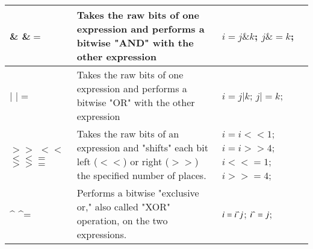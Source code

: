 \documentclass{article}
\begin{document}
\begin{center}
\begin{tabularx}{\textwidth}{
			| >{\raggedright\arraybackslash}X
			| >{\raggedright\arraybackslash}X
			| >{\raggedright\arraybackslash}X |
		}
		\hline
		\& \newline \&$=$ & Takes the raw bits of one expression and performs a bitwise "AND" with the other expression & $i = j \& k$; \newline $j \&= k$;\\
		\hline
		$\vert$ \newline $\vert=$ & Takes the raw bits of one expression and performs a bitwise "OR" with the other expression & $i = j \vert k$; \newline $j \vert= k$; \\
		\hline
		$>>$ \newline $<<$ \newline $<<=$ \newline $>>=$ & Takes the raw bits of an expression and "shifts" each bit left ($<<$) or right ($>>$) the specified number of places. & $i = i << 1$; \newline $i = i >> 4$; \newline $i <<= 1$; \newline $i >>= 4$; \\
		\hline
		\string^ \newline \string^= & Performs a bitwise "exclusive or," also called "XOR" operation, on the two expressions. & $i = i \string^ j$; \newline $i \string^= j$;\\
		\hline
	\end{tabularx}
\end{center}
\end{document}
